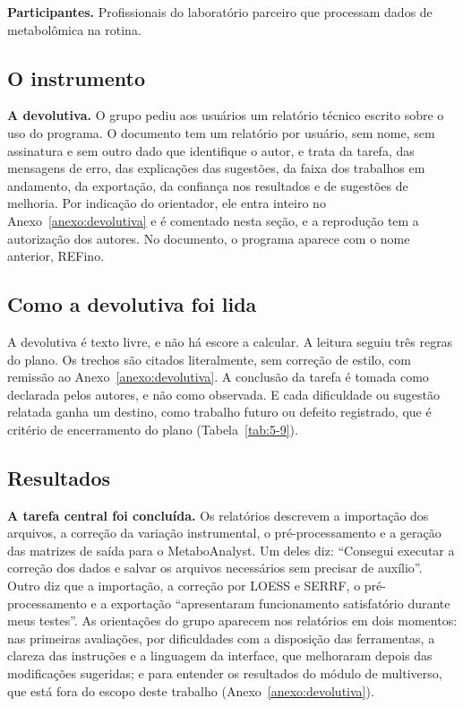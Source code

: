 \textbf{Participantes.} Profissionais do laboratório parceiro que processam dados de metabolômica na rotina.

\subsection{O instrumento}\label{sec:5-4-2}

\textbf{A devolutiva.} O grupo pediu aos usuários um relatório técnico escrito sobre o uso do programa. O documento tem um relatório por usuário, sem nome, sem assinatura e sem outro dado que identifique o autor, e trata da tarefa, das mensagens de erro, das explicações das sugestões, da faixa dos trabalhos em andamento, da exportação, da confiança nos resultados e de sugestões de melhoria. Por indicação do orientador, ele entra inteiro no Anexo~\ref{anexo:devolutiva} e é comentado nesta seção, e a reprodução tem a autorização dos autores. No documento, o programa aparece com o nome anterior, REFino.


\subsection{Como a devolutiva foi lida}\label{sec:5-4-3}

A devolutiva é texto livre, e não há escore a calcular. A leitura seguiu três regras do plano. Os trechos são citados literalmente, sem correção de estilo, com remissão ao Anexo~\ref{anexo:devolutiva}. A conclusão da tarefa é tomada como declarada pelos autores, e não como observada. E cada dificuldade ou sugestão relatada ganha um destino, como trabalho futuro ou defeito registrado, que é critério de encerramento do plano (Tabela~\ref{tab:5-9}).

\subsection{Resultados}\label{sec:5-4-4}

\textbf{A tarefa central foi concluída.} Os relatórios descrevem a importação dos arquivos, a correção da variação instrumental, o pré-processamento e a geração das matrizes de saída para o MetaboAnalyst. Um deles diz: ``Consegui executar a correção dos dados e salvar os arquivos necessários sem precisar de auxílio''. Outro diz que a importação, a correção por LOESS e SERRF, o pré-processamento e a exportação ``apresentaram funcionamento satisfatório durante meus testes''. As orientações do grupo aparecem nos relatórios em dois momentos: nas primeiras avaliações, por dificuldades com a disposição das ferramentas, a clareza das instruções e a linguagem da interface, que melhoraram depois das modificações sugeridas; e para entender os resultados do módulo de multiverso, que está fora do escopo deste trabalho (Anexo~\ref{anexo:devolutiva}).

